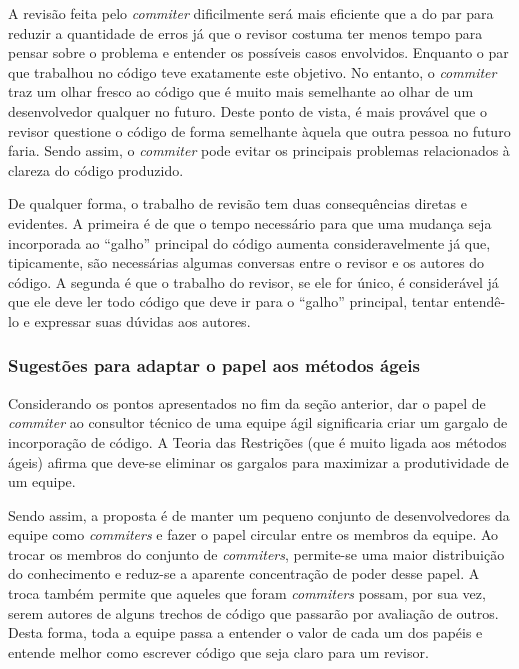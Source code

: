 A revisão feita pelo \emph{commiter} dificilmente será mais eficiente
que a do par para reduzir a quantidade de erros já que o revisor
costuma ter menos tempo para pensar sobre o problema e entender os
possíveis casos envolvidos. Enquanto o par que trabalhou no código
teve exatamente este objetivo. No entanto, o \emph{commiter} traz um
olhar fresco ao código que é muito mais semelhante ao olhar de um
desenvolvedor qualquer no futuro. Deste ponto de vista, é mais
provável que o revisor questione o código de forma semelhante àquela
que outra pessoa no futuro faria. Sendo assim, o \emph{commiter} pode
evitar os principais problemas relacionados à clareza do código
produzido.

De qualquer forma, o trabalho de revisão tem duas consequências
diretas e evidentes. A primeira é de que o tempo necessário para que
uma mudança seja incorporada ao ``galho'' principal do código aumenta
consideravelmente já que, tipicamente, são necessárias algumas
conversas entre o revisor e os autores do código. A segunda é que o
trabalho do revisor, se ele for único, é considerável já que ele deve
ler todo código que deve ir para o ``galho'' principal, tentar
entendê-lo e expressar suas dúvidas aos autores.

\subsubsection{Sugestões para adaptar o papel aos métodos ágeis}

Considerando os pontos apresentados no fim da seção anterior, dar o
papel de \emph{commiter} ao consultor técnico de uma equipe ágil
significaria criar um gargalo de incorporação de código. A Teoria das
Restrições %
(que é muito ligada aos métodos ágeis) afirma que deve-se eliminar os
gargalos para maximizar a produtividade de um equipe.

Sendo assim, a proposta é de manter um pequeno conjunto de
desenvolvedores da equipe como \emph{commiters} e fazer o papel
circular entre os membros da equipe. Ao trocar os membros do conjunto
de \emph{commiters}, permite-se uma maior distribuição do conhecimento
e reduz-se a aparente concentração de poder desse papel. A troca
também permite que aqueles que foram \emph{commiters} possam, por sua
vez, serem autores de alguns trechos de código que passarão por
avaliação de outros. Desta forma, toda a equipe passa a entender o
valor de cada um dos papéis e entende melhor como escrever código que
seja claro para um revisor.

